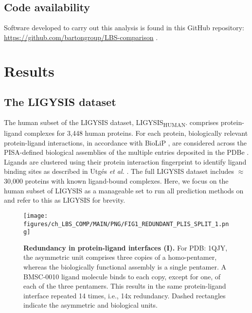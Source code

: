 \subsection{Code availability}

Software developed to carry out this analysis is found in this GitHub repository: \url{https://github.com/bartongroup/LBS-comparison} \cite{UTGES_2024_LBSCOMP_REPO}.

\section{Results}

\subsection{The LIGYSIS dataset}

The human subset of the LIGYSIS dataset, LIGYSIS\textsubscript{HUMAN}. comprises protein-ligand complexes for 3,448 human proteins. For each protein, biologically relevant protein-ligand interactions, in accordance with BioLiP \cite{YANG_2013_BIOLIP}, are considered across the PISA-defined \cite{KRISSINEL_2007_PISA} biological assemblies of the multiple entries deposited in the PDBe \cite{ARMSTRONG_2020_PDBE}. Ligands are clustered using their protein interaction fingerprint to identify ligand binding sites as described in Utgés \textit{et al.} \cite{UTGES_2024_FRAGSYS, UTGES_2024_FRAGSYS_ZENODO}. The full LIGYSIS dataset includes $\approx$30,000 proteins with known ligand-bound complexes. Here, we focus on the human subset of LIGYSIS as a manageable set to run all prediction methods on and refer to this as LIGYSIS for brevity.

\begin{figure}[htb!]
    \centering
    \texttt{[image: figures/ch\_LBS\_COMP/MAIN/PNG/FIG1\_REDUNDANT\_PLIS\_SPLIT\_1.png]}
    \caption[Redundancy in protein-ligand interfaces (I)]{\textbf{Redundancy in protein-ligand interfaces (I).} For PDB: 1QJY, the asymmetric unit comprises three copies of a homo-pentamer, whereas the biologically functional assembly is a single pentamer. A BMSC-0010 ligand molecule binds to each copy, except for one, of each of the three pentamers. This results in the same protein-ligand interface repeated 14 times, i.e., 14x redundancy. Dashed rectangles indicate the asymmetric and biological units.}
    \label{fig:redundant_plis_1}
\end{figure}

